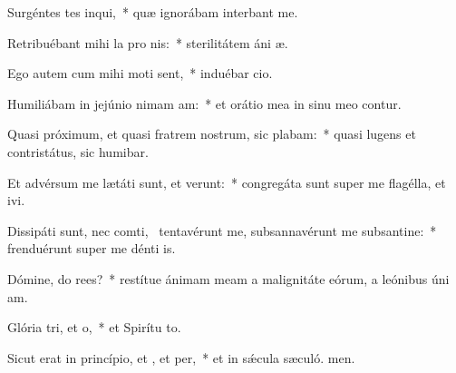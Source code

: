 \item Surgéntes tes inqui,~* quæ ignorábam interbant me.
\item Retribuébant mihi la pro nis:~* sterilitátem áni æ.
\item Ego autem cum mihi moti sent,~* induébar cio.
\item Humiliábam in jejúnio nimam am:~* et orátio mea in sinu meo contur.
\item Quasi próximum, et quasi fratrem nostrum, sic plabam:~* quasi lugens et contristátus, sic humibar.
\item Et advérsum me lætáti sunt, et verunt:~* congregáta sunt super me flagélla, et ivi.
\item Dissipáti sunt, nec comti,~\pscross{} tentavérunt me, subsannavérunt me subsantine:~* frenduérunt super me dénti is.
\item Dómine, do rees?~* restítue ánimam meam a malignitáte eórum, a leónibus úni am.
\item Glória tri, et o,~* et Spirítu to.
\item Sicut erat in princípio, et , et per,~* et in sǽcula sæculó. men.
